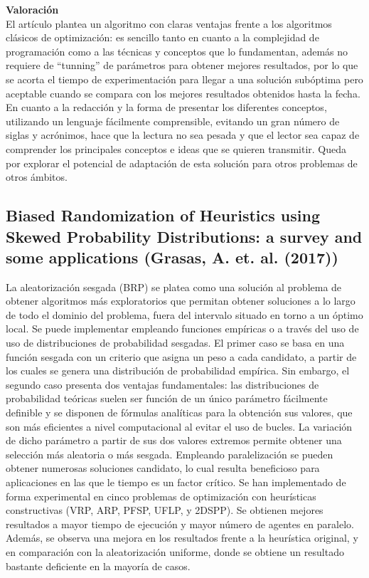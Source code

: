 \documentclass[11pt]{article} %
\begin{document}
\textbf{Valoración}\\[0.2cm]

El artículo plantea un algoritmo con claras ventajas frente a los algoritmos clásicos de optimización: es sencillo tanto en cuanto a la complejidad de programación como a las técnicas y conceptos que lo fundamentan, además no requiere de “tunning” de parámetros para obtener mejores resultados, por lo que se acorta el tiempo de experimentación para llegar a una solución subóptima pero aceptable cuando se compara con los mejores resultados obtenidos hasta la fecha. En cuanto a la redacción y la forma de presentar los diferentes conceptos, utilizando un lenguaje fácilmente comprensible, evitando un gran número de siglas y acrónimos, hace que la lectura no sea pesada y que el lector sea capaz de comprender los principales conceptos e ideas que se quieren transmitir. Queda por explorar el potencial de adaptación de esta solución para otros problemas de otros ámbitos.

\clearpage

\subsection{Biased Randomization of Heuristics using Skewed Probability Distributions: a survey and some applications (Grasas, A. et. al. (2017))}

La aleatorización sesgada (BRP) se platea como una solución al problema de obtener algoritmos más exploratorios que permitan obtener soluciones a lo largo de todo el dominio del problema, fuera del intervalo situado en torno a un óptimo local. Se puede implementar empleando funciones empíricas o a través del uso de uso de distribuciones de probabilidad sesgadas. El primer caso se basa en una función sesgada con un criterio que asigna un peso a cada candidato, a partir de los cuales se genera una distribución de probabilidad empírica. Sin embargo, el segundo caso presenta dos ventajas fundamentales: las distribuciones de probabilidad teóricas suelen ser función de un único parámetro fácilmente definible y se disponen de fórmulas analíticas para la obtención sus valores, que son más eficientes a nivel computacional al evitar el uso de bucles. La variación de dicho parámetro a partir de sus dos valores extremos permite obtener una selección más aleatoria o más sesgada. Empleando paralelización se pueden obtener numerosas soluciones candidato, lo cual resulta beneficioso para aplicaciones en las que le tiempo es un factor crítico. Se han implementado de forma experimental en cinco problemas de optimización con heurísticas constructivas (VRP, ARP, PFSP, UFLP, y 2DSPP). Se obtienen mejores resultados a mayor tiempo de ejecución y mayor número de agentes en paralelo. Además, se observa una mejora en los resultados frente a la heurística original, y en comparación con la aleatorización uniforme, donde se obtiene un resultado bastante deficiente en la mayoría de casos. \\[0.2cm]
\end{document}

